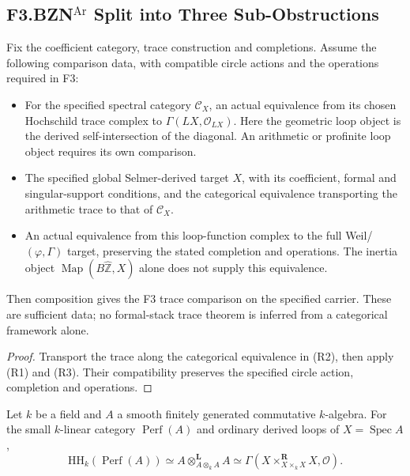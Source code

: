 \subsection{\texorpdfstring{F3.BZN\(^{\mathrm{Ar}}\)}{F3-BZN-Ar} Split into Three Sub-Obstructions}

\begin{theorem}
\label{v4-arith:sw:thm:BZN-Ar-split}
Fix the coefficient category, trace construction and completions.
Assume the following comparison data, with compatible circle actions
and the operations required in F3:
\begin{itemize}
\item[(R1)] For the specified spectral category \(\mathcal C_X\),
an actual equivalence from its chosen Hochschild trace complex to
\(\Gamma(LX,\mathcal O_{LX})\). Here the geometric loop object is
the derived self-intersection of the diagonal. An arithmetic or
profinite loop object requires its own comparison.
\item[(R2)] The specified global Selmer-derived target \(X\), with
its coefficient, formal and singular-support conditions, and the
categorical equivalence transporting the arithmetic trace to
that of \(\mathcal C_X\).
\item[(R3)] An actual equivalence from this loop-function complex
to the full Weil/\((\varphi,\Gamma)\) target, preserving the
stated completion and operations. The inertia object
\(\operatorname{Map}(B\widehat{\mathbb Z},X)\) alone does not
supply this equivalence.
\end{itemize}
Then composition gives the F3 trace comparison on the specified
carrier. These are sufficient data; no formal-stack trace theorem
is inferred from a categorical framework alone.
\end{theorem}
\begin{proof}
Transport the trace along the categorical equivalence in (R2),
then apply (R1) and (R3). Their compatibility preserves the specified
circle action, completion and operations.
\end{proof}
\begin{proposition}
\label{v4-arith:sw:prop:affine-trace-model}
Let \(k\) be a field and \(A\) a smooth finitely generated
commutative \(k\)-algebra. For the small \(k\)-linear category
\(\operatorname{Perf}(A)\) and ordinary derived loops of
\(X=\operatorname{Spec}A\),
\[
 \mathrm{HH}_k(\operatorname{Perf}(A))
 \simeq A\otimes^{\mathbf L}_{A\otimes_k A}A
 \simeq\Gamma(X\mathbin{\times^{\mathbf R}_{X\times_k X}}X,
                   \mathcal O).
\]
\end{proposition}
